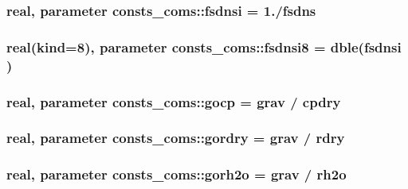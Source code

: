 \subsubsection[{\texorpdfstring{fsdnsi}{fsdnsi}}]{\setlength{\rightskip}{0pt plus 5cm}real, parameter consts\+\_\+coms\+::fsdnsi = 1./{\bf fsdns}}\hypertarget{namespaceconsts__coms_a75c6813a29c7acfe89551da232b96078}{}\label{namespaceconsts__coms_a75c6813a29c7acfe89551da232b96078}
\subsubsection[{\texorpdfstring{fsdnsi8}{fsdnsi8}}]{\setlength{\rightskip}{0pt plus 5cm}real(kind=8), parameter consts\+\_\+coms\+::fsdnsi8 = dble({\bf fsdnsi} )}\hypertarget{namespaceconsts__coms_a1d3aceb39f9cba756c3b95e2e6a81f6e}{}\label{namespaceconsts__coms_a1d3aceb39f9cba756c3b95e2e6a81f6e}
\subsubsection[{\texorpdfstring{gocp}{gocp}}]{\setlength{\rightskip}{0pt plus 5cm}real, parameter consts\+\_\+coms\+::gocp = {\bf grav} / {\bf cpdry}}\hypertarget{namespaceconsts__coms_ab3b9cff7d1f517cc66c515e4d796d481}{}\label{namespaceconsts__coms_ab3b9cff7d1f517cc66c515e4d796d481}
\subsubsection[{\texorpdfstring{gordry}{gordry}}]{\setlength{\rightskip}{0pt plus 5cm}real, parameter consts\+\_\+coms\+::gordry = {\bf grav} / {\bf rdry}}\hypertarget{namespaceconsts__coms_aedafedbfca68fe674d2905ccca6b25b7}{}\label{namespaceconsts__coms_aedafedbfca68fe674d2905ccca6b25b7}
\subsubsection[{\texorpdfstring{gorh2o}{gorh2o}}]{\setlength{\rightskip}{0pt plus 5cm}real, parameter consts\+\_\+coms\+::gorh2o = {\bf grav} / {\bf rh2o}}\hypertarget{namespaceconsts__coms_a0c33752e08988561908066daaa3574b9}{}\label{namespaceconsts__coms_a0c33752e08988561908066daaa3574b9}
